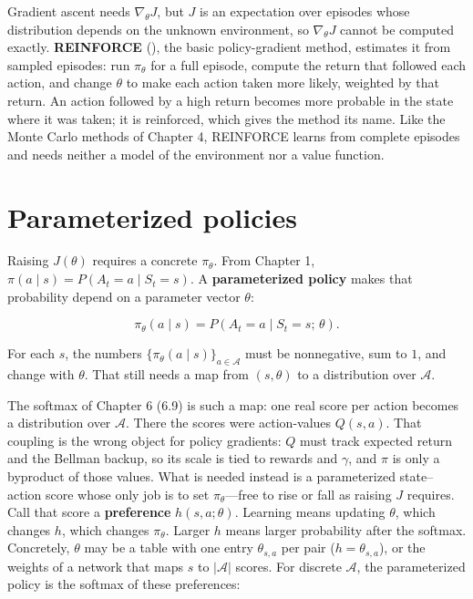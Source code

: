 Gradient ascent needs $\nabla_\theta J$, but $J$ is an expectation over episodes whose distribution depends on the unknown environment, so $\nabla_\theta J$ cannot be computed exactly. \textbf{REINFORCE} (), the basic policy-gradient method, estimates it from sampled episodes: run $\pi_\theta$ for a full episode, compute the return that followed each action, and change $\theta$ to make each action taken more likely, weighted by that return. An action followed by a high return becomes more probable in the state where it was taken; it is reinforced, which gives the method its name. Like the Monte Carlo methods of Chapter 4, REINFORCE learns from complete episodes and needs neither a model of the environment nor a value function.

\section{Parameterized policies}

Raising $J(\theta)$ requires a concrete $\pi_\theta$. From Chapter 1, $\pi(a\mid s)=P(A_t=a\mid S_t=s)$. A \textbf{parameterized policy} makes that probability depend on a parameter vector $\theta$:

\[
\pi_\theta(a\mid s)
=
P(A_t=a\mid S_t=s;\,\theta).
\]

For each $s$, the numbers $\{\pi_\theta(a\mid s)\}_{a\in\mathcal{A}}$ must be nonnegative, sum to $1$, and change with $\theta$. That still needs a map from $(s,\theta)$ to a distribution over $\mathcal{A}$.

The softmax of Chapter 6 (6.9) is such a map: one real score per action becomes a distribution over $\mathcal{A}$. There the scores were action-values $Q(s,a)$. That coupling is the wrong object for policy gradients: $Q$ must track expected return and the Bellman backup, so its scale is tied to rewards and $\gamma$, and $\pi$ is only a byproduct of those values. What is needed instead is a parameterized state--action score whose only job is to set $\pi_\theta$---free to rise or fall as raising $J$ requires. Call that score a \textbf{preference} $h(s,a;\theta)$. Learning means updating $\theta$, which changes $h$, which changes $\pi_\theta$. Larger $h$ means larger probability after the softmax. Concretely, $\theta$ may be a table with one entry $\theta_{s,a}$ per pair ($h=\theta_{s,a}$), or the weights of a network that maps $s$ to $|\mathcal{A}|$ scores. For discrete $\mathcal{A}$, the parameterized policy is the softmax of these preferences:

